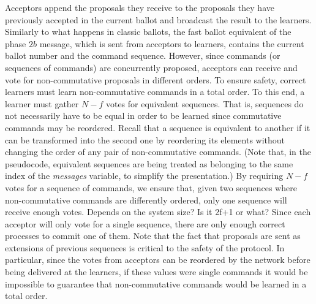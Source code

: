 Acceptors append the proposals they receive to the proposals they have previously accepted in the current ballot and broadcast the result to the learners. Similarly to what happens in classic ballots, the fast ballot equivalent of the phase $2b$ message, which is sent from acceptors to learners, contains the current ballot number and the command sequence. However, since commands (or sequences of commands) are concurrently proposed, acceptors can receive and vote for non-commutative proposals in different orders. To ensure safety, correct learners must learn non-commutative commands in a total order. To this end, a learner must gather $N-f$ votes for equivalent sequences. That is, sequences do not necessarily have to be equal in order to be learned since commutative commands may be reordered. Recall that a sequence is equivalent to another if it can be transformed into the second one by reordering its elements without changing the order of any pair of non-commutative commands. (Note that, in the pseudocode, equivalent sequences are being treated as belonging to the same index of the \emph{messages} variable, to simplify the presentation.) By requiring $N-f$ votes for a sequence of commands, we ensure that, given two sequences where non-commutative commands are differently ordered, only one sequence will receive enough votes. {\color{red} Depends on the system size? Is it 2f+1 or what?} Since each acceptor will only vote for a single sequence, there are only enough correct processes to commit one of them. Note that the fact that proposals are sent as extensions of previous sequences is critical to the safety of the protocol. In particular, since the votes from acceptors can be reordered by the network before being delivered at the learners, if these values were single commands it would be impossible to guarantee that non-commutative commands would be learned in a total order. \par

